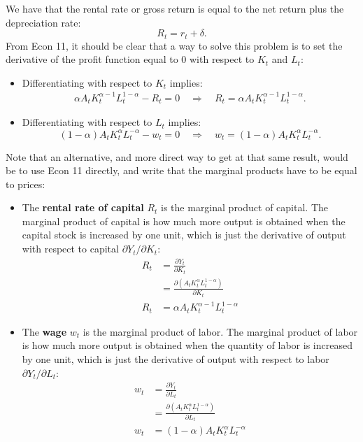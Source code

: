 \documentclass[]{book}
\providecommand{\tightlist}{%
  \setlength{\itemsep}{0pt}\setlength{\parskip}{0pt}}
\theoremstyle{definition}
\theoremstyle{definition}
\theoremstyle{definition}
\theoremstyle{remark}
\begin{document}
We have that the rental rate or gross return is equal to the net return
plus the depreciation rate: \[\boxed{R_t = r_t + \delta}.\] From Econ
11, it should be clear that a way to solve this problem is to set the
derivative of the profit function equal to \(0\) with respect to \(K_t\)
and \(L_t\):

\begin{itemize}
\tightlist
\item
  Differentiating with respect to \(K_t\) implies: \[
  \begin{aligned}
  \alpha A_t K_t^{\alpha-1} L_t^{1-\alpha} - R_t = 0 \quad \Rightarrow \quad \boxed{R_t = \alpha A_t K_t^{\alpha-1} L_t^{1-\alpha}}.
  \end{aligned}
  \]
\item
  Differentiating with respect to \(L_t\) implies:
  \[(1-\alpha) A_t K_t^{\alpha} L_t^{-\alpha} - w_t = 0 \quad \Rightarrow \quad \boxed{w_t = (1-\alpha) A_t K_t^{\alpha} L_t^{-\alpha}}.\]
\end{itemize}

Note that an alternative, and more direct way to get at that same
result, would be to use Econ 11 directly, and write that the marginal
products have to be equal to prices:

\begin{itemize}
\tightlist
\item
  The \textbf{rental rate of capital} \(R_t\) is the marginal product of
  capital. The marginal product of capital is how much more output is
  obtained when the capital stock is increased by one unit, which is
  just the derivative of output with respect to capital
  \(\partial Y_t / \partial K_t\): \[
  \begin{aligned}
  R_t&=\frac{\partial Y_t}{\partial K_t}\\
  &= \frac{\partial \left(A_t K_t^{\alpha} L_t^{1-\alpha}\right)}{\partial K_t}\\
  R_t &= \alpha A_t K_t^{\alpha-1} L_t^{1-\alpha}
  \end{aligned}
  \]
\item
  The \textbf{wage} \(w_t\) is the marginal product of labor. The
  marginal product of labor is how much more output is obtained when the
  quantity of labor is increased by one unit, which is just the
  derivative of output with respect to labor
  \(\partial Y_t / \partial L_t\): \[
  \begin{aligned}
  w_t &=\frac{\partial Y_t}{\partial L_t}\\
  &= \frac{\partial \left(A_t K_t^{\alpha} L_t^{1-\alpha}\right)}{\partial L_t}\\
  w_t &= (1-\alpha) A_t K_t^{\alpha} L_t^{-\alpha}
  \end{aligned}
  \]
\end{itemize}
\end{document}
